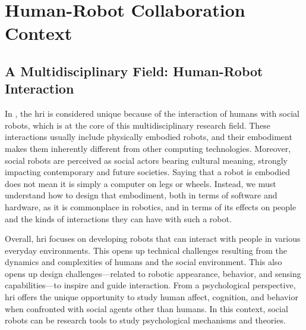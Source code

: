 \cleardoublepage

\ifdefined{}
\else
\setcounter{chapter}{0}
\dominitoc
\faketableofcontents
\fi

\chapter{Human-Robot Collaboration Context}
\label{chap:1}
\minitoc






\section{A Multidisciplinary Field: Human-Robot Interaction}

In \cite{bartneck_human_robot_2020}, the \acrfull{hri} is considered unique because of the interaction of humans with social robots, which is at the core of this multidisciplinary research field. These interactions usually include physically embodied robots, and their embodiment makes them inherently different from other computing technologies. Moreover, social robots are perceived as social actors bearing cultural meaning, strongly impacting contemporary and future societies. Saying that a robot is embodied does not mean it is simply a computer on legs or wheels. Instead, we must understand how to design that embodiment, both in terms of software and hardware, as it is commonplace in robotics, and in terms of its effects on people and the kinds of interactions they can have with such a robot.

Overall, \acrfull{hri} focuses on developing robots that can interact with people in various everyday environments. This opens up technical challenges resulting from the dynamics and complexities of humans and the social environment. This also opens up design challenges—related to robotic appearance, behavior, and sensing capabilities—to inspire and guide interaction. From a psychological perspective, \acrshort{hri} offers the unique opportunity to study human affect, cognition, and behavior when confronted with social agents other than humans. In this context, social robots can be research tools to study psychological mechanisms and theories.

